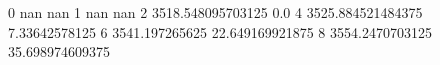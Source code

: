 0 nan nan
1 nan nan
2 3518.548095703125 0.0
4 3525.884521484375 7.33642578125
6 3541.197265625 22.649169921875
8 3554.2470703125 35.698974609375
